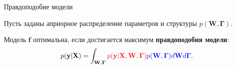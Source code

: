 \documentclass[usenames,dvipsnames,11pt,pdf,utf8,russian,aspectratio=169]{beamer}
\begin{document}
\begin{frame}{Правдоподобие модели}  
                                                                                          
Пусть заданы априорное распределение параметров и структуры $p(\mathbf{W}, \boldsymbol{\Gamma})$.

Модель $\mathbf{f}$  оптимальна, если достигается максимум \textbf{правдоподобия модели}:                                      
\[                                                                                                                                              
        p(\mathbf{y}|\mathbf{X}) = \int_{\mathbf{W}, \boldsymbol{\Gamma} } \textcolor{red}{p(\mathbf{y}|\mathbf{X},\mathbf{W},  \boldsymbol{\Gamma})} \textcolor{blue}{p(\mathbf{W}, \boldsymbol{\Gamma}) d\mathbf{W}d{\boldsymbol{\Gamma}}}.                         
\]       


\begin{figure}
  \centering

\end{figure}
\end{frame}
\end{document}
